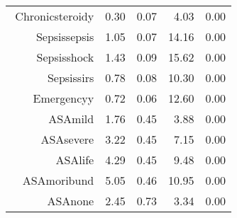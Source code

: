 \begin{tabular}{rrrrr}
$$  Chronic\-steroid\-y & 0.30 & 0.07 & 4.03 & 0.00 \\ 
  Sepsis\-sepsis & 1.05 & 0.07 & 14.16 & 0.00 \\ 
  Sepsis\-shock & 1.43 & 0.09 & 15.62 & 0.00 \\ 
  Sepsis\-sirs & 0.78 & 0.08 & 10.30 & 0.00 \\ 
  Emergency\-y & 0.72 & 0.06 & 12.60 & 0.00 \\ 
  ASA\-mild & 1.76 & 0.45 & 3.88 & 0.00 \\ 
  ASA\-severe & 3.22 & 0.45 & 7.15 & 0.00 \\ 
  ASA\-life & 4.29 & 0.45 & 9.48 & 0.00 \\ 
  ASA\-moribund & 5.05 & 0.46 & 10.95 & 0.00 \\ 
  ASA\-none & 2.45 & 0.73 & 3.34 & 0.00 \\ 
   \hline
\end{tabular}

